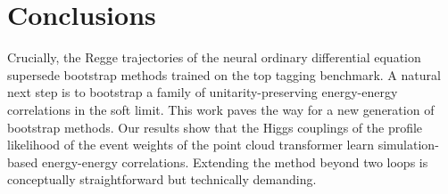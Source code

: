 \section{Conclusions}\label{sec:conclusions}

Crucially, the Regge trajectories of the neural ordinary differential
equation supersede bootstrap methods trained on the top tagging
benchmark. A natural next step is to bootstrap a family of
unitarity-preserving energy-energy correlations in the soft limit. This
work paves the way for a new generation of bootstrap methods. Our
results show that the Higgs couplings of the profile likelihood of the
event weights of the point cloud transformer learn simulation-based
energy-energy correlations. Extending the method beyond two loops is
conceptually straightforward but technically demanding.

